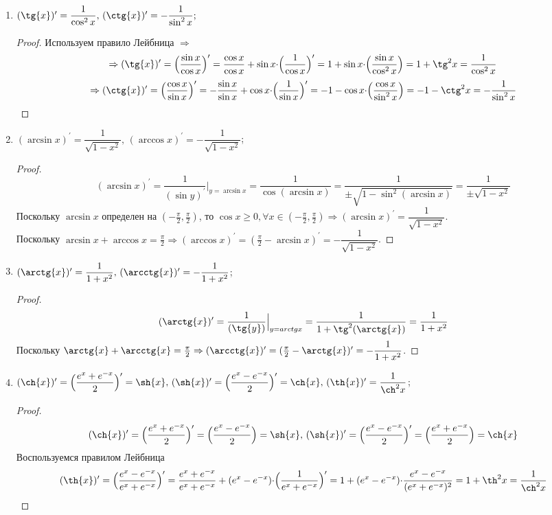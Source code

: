 \documentclass[12pt]{article}
\theoremstyle{definition}
\begin{document}
\begin{enumerate}[label={(\arabic*)}]
\begin{proof}
			$(\cos{x})^\prime = (\sin{(\frac{\pi}{2}-x)})^\prime = \cos{(\frac{\pi}{2}-x)}{\cdot}(-1) = - \sin{x}$;
		\end{proof}
	\item $(\tg{x})^\prime = \dfrac{1}{\cos^2{x}}, \, (\ctg{x})^\prime = -\dfrac{1}{\sin^2{x} };$
		\begin{proof}
			Используем правило Лейбница $\Rightarrow$ 
			$$ \Rightarrow (\tg{x})^\prime = \Big(\frac{\sin{x}}{\cos{x}} \Big)^\prime = \frac{\cos{x}}{\cos{x}} + \sin{x}{\cdot} \Big(\frac{1}{\cos{x}} \Big)^\prime = 1 + \sin{x}{\cdot}\Big(\frac{\sin{x}}{\cos^2{x}}\Big) = 1 + \tg^2{x} = \dfrac{1}{\cos^2{x} }$$
			$$ \Rightarrow (\ctg{x})^\prime = \Big(\frac{\cos{x}}{\sin{x}} \Big)^\prime = -\frac{\sin{x}}{\sin{x}} + \cos{x}{\cdot} \Big(\frac{1}{\sin{x}} \Big)^\prime = -1 - \cos{x}{\cdot}\Big(\frac{\cos{x}}{\sin^2{x}}\Big) = -1 - \ctg^2{x} = -\dfrac{1}{\sin^2{x} }$$
		\end{proof}
	\newpage
	\item $(\arcsin{x})^\prime = \dfrac{1}{\sqrt{1-x^2}}, \, (\arccos{x})^\prime = -\dfrac{1}{\sqrt{1-x^2}}$;
		\begin{proof}
			$$(\arcsin{x})^\prime = \dfrac{1}{(\sin{y})^\prime}\Big|_{y = \arcsin{x}} = \dfrac{1}{\cos{(\arcsin{x})}} = \dfrac{1}{\pm \sqrt{1 - \sin^2{(\arcsin{x})}} } = \dfrac{1}{\pm\sqrt{1 - x^2}}$$ 
			Поскольку $\arcsin{x}$ определен на $(-\tfrac{\pi}{2},\tfrac{\pi}{2})$, то $\cos{x} \geq 0, \forall x\in (-\tfrac{\pi}{2},\tfrac{\pi}{2}) \Rightarrow (\arcsin{x})^\prime = \dfrac{1}{\sqrt{1 - x^2}}$.\\
			Поскольку $\arcsin{x} + \arccos{x} = \frac{\pi}{2} \Rightarrow (\arccos{x})^\prime = (\frac{\pi}{2} - \arcsin{x})^\prime = - \dfrac{1}{\sqrt{1-x^2}}$.
		\end{proof}
	\item $(\arctg{x})^\prime = \dfrac{1}{1 + x^2}, \, (\arcctg{x})^\prime = -\dfrac{1}{1 + x^2}$;
		\begin{proof}
			$$(\arctg{x})^\prime = \dfrac{1}{(\tg{y})}\Big|_{y = arctg{x}} = \dfrac{1}{1 + \tg^2{(\arctg{x})}} = \dfrac{1}{1 + x^2}$$
			Поскольку $\arctg{x} + \arcctg{x} = \frac{\pi}{2} \Rightarrow (\arcctg{x})^\prime = (\frac{\pi}{2} - \arctg{x})^\prime = - \dfrac{1}{1+ x^2}$.
		\end{proof}
	\item $(\ch{x})^\prime = \Big(\dfrac{e^x + e^{-x}}{2}\Big)^\prime = \sh{x}, \, (\sh{x})^\prime = \Big(\dfrac{e^x - e^{-x}}{2}\Big)^\prime = \ch{x}, \, (\th{x})^\prime = \dfrac{1}{\ch^2{x}}$;
		\begin{proof}
			$$(\ch{x})^\prime = \Big(\dfrac{e^x + e^{-x}}{2}\Big)^\prime = \Big(\dfrac{e^x - e^{-x}}{2}\Big) = \sh{x}, \, (\sh{x})^\prime = \Big(\dfrac{e^x - e^{-x}}{2}\Big)^\prime = \Big(\dfrac{e^x + e^{-x}}{2}\Big) = \ch{x}$$
			Воспользуемся правилом Лейбница 
			$$(\th{x})^\prime =  \Big(\dfrac{e^x - e^{-x}}{e^x + e^{-x}}\Big)^\prime = \dfrac{e^x + e^{-x}}{e^x + e^{-x}} + (e^x - e^{-x}){\cdot}\Big( \dfrac{1}{e^x + e^{-x}}\Big)^\prime = 1 + (e^x - e^{-x}){\cdot}\dfrac{e^x - e^{-x}}{(e^x + e^{-x})^2} = 1 + \th^2{x} = \dfrac{1}{\ch^2{x}}$$
		\end{proof}
\end{enumerate}
\end{document}
